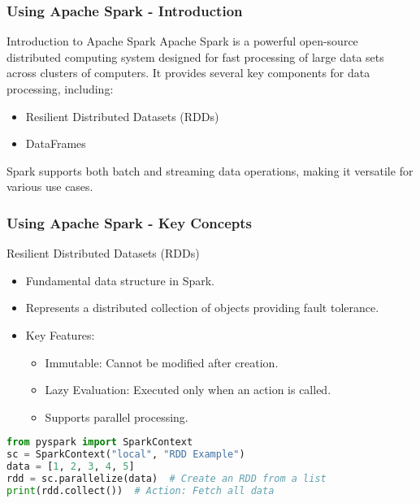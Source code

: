 \documentclass[aspectratio=169]{beamer}
\begin{document}
\begin{frame}[fragile]
    \frametitle{Using Apache Spark - Introduction}
    \begin{block}{Introduction to Apache Spark}
        Apache Spark is a powerful open-source distributed computing system designed for fast processing of large data sets across clusters of computers. 
        It provides several key components for data processing, including:
        \begin{itemize}
            \item Resilient Distributed Datasets (RDDs)
            \item DataFrames
        \end{itemize}
        Spark supports both batch and streaming data operations, making it versatile for various use cases.
    \end{block}
\end{frame}

\begin{frame}[fragile]
    \frametitle{Using Apache Spark - Key Concepts}
    \begin{block}{Resilient Distributed Datasets (RDDs)}
        \begin{itemize}
            \item Fundamental data structure in Spark.
            \item Represents a distributed collection of objects providing fault tolerance.
            \item Key Features:
            \begin{itemize}
                \item Immutable: Cannot be modified after creation.
                \item Lazy Evaluation: Executed only when an action is called.
                \item Supports parallel processing.
            \end{itemize}
        \end{itemize}
        \begin{lstlisting}[language=Python]
from pyspark import SparkContext
sc = SparkContext("local", "RDD Example")
data = [1, 2, 3, 4, 5]
rdd = sc.parallelize(data)  # Create an RDD from a list
print(rdd.collect())  # Action: Fetch all data
        \end{lstlisting}
    \end{block}
\end{frame}
\end{document}
